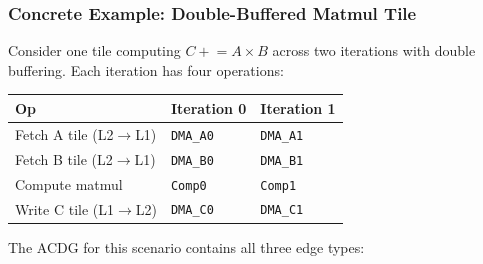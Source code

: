 \documentclass[11pt,a4paper]{article}
\begin{document}
\subsubsection{Concrete Example: Double-Buffered Matmul Tile}

Consider one tile computing $C \mathrel{+}= A \times B$ across two iterations with
double buffering. Each iteration has four operations:

\begin{center}
\small
\begin{tabular}{lll}
\toprule
\textbf{Op} & \textbf{Iteration 0} & \textbf{Iteration 1} \\
\midrule
Fetch A tile (L2$\rightarrow$L1) & \texttt{DMA\_A0} & \texttt{DMA\_A1} \\
Fetch B tile (L2$\rightarrow$L1) & \texttt{DMA\_B0} & \texttt{DMA\_B1} \\
Compute matmul & \texttt{Comp0} & \texttt{Comp1} \\
Write C tile (L1$\rightarrow$L2) & \texttt{DMA\_C0} & \texttt{DMA\_C1} \\
\bottomrule
\end{tabular}
\end{center}

The ACDG for this scenario contains all three edge types:
\end{document}
